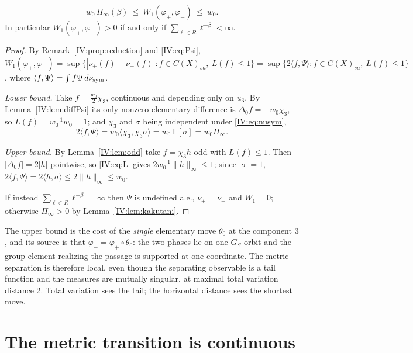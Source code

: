 \begin{theorem}[Squeeze]\label{IV:thm:squeeze}
\begin{equation}\label{IV:eq:squeeze}
w_0\,\Pi_\infty(\beta)\ \le\ W_1(\varphi_+,\varphi_-)\ \le\ w_0 .
\end{equation}
In particular $W_1(\varphi_+,\varphi_-)>0$ if and only if
$\sum_{\ell\in R}\ell^{-\beta}<\infty$.
\end{theorem}

\begin{proof}
By Remark~\ref{IV:prop:reduction} and \eqref{IV:eq:Psi},
$W_1(\varphi_+,\varphi_-)=\sup\{|\nu_+(f)-\nu_-(f)|:f\in C(X)_{sa},\ L(f)\le1\}
=\sup\{2\langle f,\Psi\rangle:f\in C(X)_{sa},\ L(f)\le1\}$, where
$\langle f,\Psi\rangle=\int f\Psi\,d\nu_{\mathrm{sym}}$.

\emph{Lower bound.} Take $f=\tfrac{w_0}{2}\chi_3$, continuous and depending only on $u_3$. By
Lemma~\ref{IV:lem:diffPsi} its only nonzero elementary difference is $\Delta_0f=-w_0\chi_3$, so
$L(f)=w_0^{-1}w_0=1$; and $\chi_3$ and $\sigma$ being independent under \eqref{IV:eq:nusym},
\[
2\langle f,\Psi\rangle=w_0\langle\chi_3,\chi_3\sigma\rangle=w_0\,\mathbb E[\sigma]=w_0\Pi_\infty .
\]

\emph{Upper bound.} By Lemma~\ref{IV:lem:odd} take $f=\chi_3h$ odd with $L(f)\le1$. Then
$|\Delta_0f|=2|h|$ pointwise, so \eqref{IV:eq:L} gives $2w_0^{-1}\|h\|_\infty\le1$; since
$|\sigma|=1$,
$2\langle f,\Psi\rangle=2\langle h,\sigma\rangle\le2\|h\|_\infty\le w_0$.

If instead $\sum_{\ell\in R}\ell^{-\beta}=\infty$ then $\Psi$ is undefined a.e.,
$\nu_+=\nu_-$ and $W_1=0$; otherwise $\Pi_\infty>0$ by Lemma~\ref{IV:lem:kakutani}.
\end{proof}

\begin{remark}\label{IV:rem:locality}
The upper bound is the cost of the \emph{single} elementary move $\theta_0$ at the component
$3$, and its source is that $\varphi_-=\varphi_+\circ\theta_0$: the two phases lie on one
$G_S$-orbit and the group element realizing the passage is supported at one coordinate. The
metric separation is therefore local, even though the separating observable is a tail
function and the measures are mutually singular, at maximal total variation distance $2$.
Total variation sees the tail; the horizontal distance sees the shortest move.
\end{remark}

\section{The metric transition is continuous}

